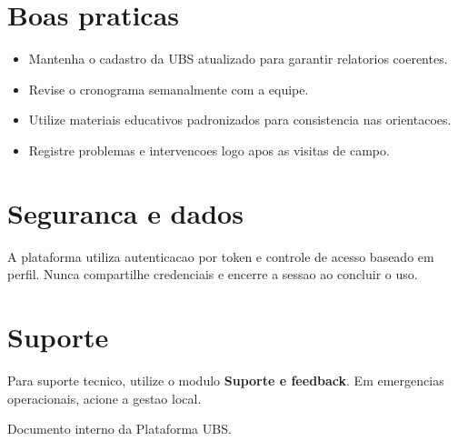 \documentclass[12pt,a4paper]{article}
\begin{document}
\section{Boas praticas}
\begin{itemize}[leftmargin=*]
  \item Mantenha o cadastro da UBS atualizado para garantir relatorios coerentes.
  \item Revise o cronograma semanalmente com a equipe.
  \item Utilize materiais educativos padronizados para consistencia nas orientacoes.
  \item Registre problemas e intervencoes logo apos as visitas de campo.
\end{itemize}

\section{Seguranca e dados}
A plataforma utiliza autenticacao por token e controle de acesso baseado em perfil. Nunca compartilhe credenciais e encerre a sessao ao concluir o uso.

\section{Suporte}
Para suporte tecnico, utilize o modulo \textbf{Suporte e feedback}. Em emergencias operacionais, acione a gestao local.

\vfill
\begin{center}
  {\small \color{Slate}Documento interno da Plataforma UBS.}\par
\end{center}
\end{document}

